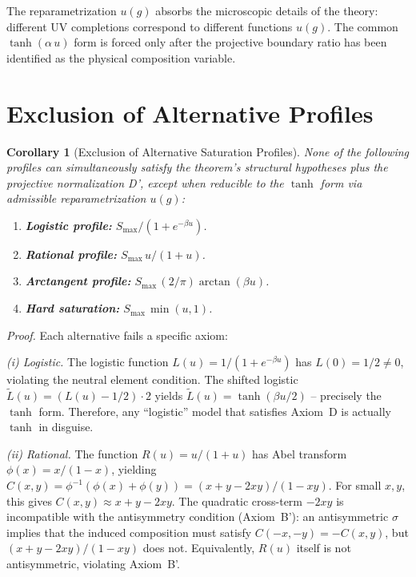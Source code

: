 \documentclass[aps,prd,twocolumn,superscriptaddress,nofootinbib]{revtex4-2}
\newtheorem{corollary}{Corollary}
\begin{document}
The reparametrization $u(g)$ absorbs the microscopic details of the theory: different UV completions correspond to different functions $u(g)$. The common $\tanh(\alpha\,u)$ form is forced only after the projective boundary ratio has been identified as the physical composition variable.


\section{Exclusion of Alternative Profiles}
\label{sec:exclusion}

\begin{corollary}[Exclusion of Alternative Saturation Profiles]
\label{cor:exclusion}
None of the following profiles can simultaneously satisfy the theorem's structural hypotheses plus the projective normalization D', except when reducible to the $\tanh$ form via admissible reparametrization $u(g)$:
\begin{enumerate}
\item[(i)] \textbf{Logistic profile:} $S_{\max}/(1 + e^{-\beta u})$.
\item[(ii)] \textbf{Rational profile:} $S_{\max}\,u/(1 + u)$.
\item[(iii)] \textbf{Arctangent profile:} $S_{\max}\,(2/\pi)\arctan(\beta u)$.
\item[(iv)] \textbf{Hard saturation:} $S_{\max}\,\min(u, 1)$.
\end{enumerate}
\end{corollary}

\textit{Proof.} Each alternative fails a specific axiom:

\textit{(i) Logistic.} The logistic function $L(u) = 1/(1 + e^{-\beta u})$ has $L(0) = 1/2 \neq 0$, violating the neutral element condition. The shifted logistic $\tilde{L}(u) = (L(u) - 1/2) \cdot 2$ yields $\tilde{L}(u) = \tanh(\beta u/2)$ -- precisely the $\tanh$ form. Therefore, any ``logistic'' model that satisfies Axiom~D is actually $\tanh$ in disguise.

\textit{(ii) Rational.} The function $R(u) = u/(1+u)$ has Abel transform $\phi(x) = x/(1-x)$, yielding $C(x,y) = \phi^{-1}(\phi(x) + \phi(y)) = (x + y - 2xy)/(1 - xy)$. For small $x, y$, this gives $C(x,y) \approx x + y - 2xy$. The quadratic cross-term $-2xy$ is incompatible with the antisymmetry condition (Axiom~B'): an antisymmetric $\sigma$ implies that the induced composition must satisfy $C(-x,-y) = -C(x,y)$, but $(x+y-2xy)/(1-xy)$ does not. Equivalently, $R(u)$ itself is not antisymmetric, violating Axiom~B'.
\end{document}
